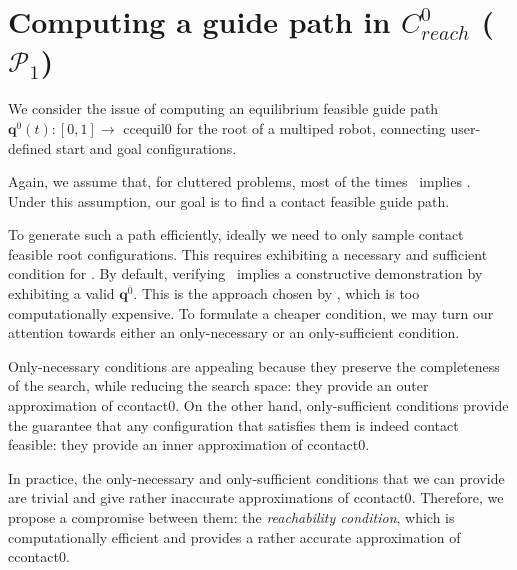 \section{Computing a guide path in $C^0_{reach}$ ($\mathcal{P}_1$) }
\label{rbprm}

We consider the issue of computing an \gls{equilibrium feasible} guide path $\mathbf{q}^0(t) : [0,1] \longrightarrow$ \gls{ccequil0} for the root of a multiped robot, connecting user-defined start and goal configurations.

Again, we assume that, for \gls{cluttered} problems, most of the times \contactfeasibility\, implies \equilibriumfeasibility.
Under this assumption, our goal is to find a \gls{contact feasible} guide path.

To generate such a path efficiently, ideally we need to only sample \gls{contact feasible} root configurations.
This requires exhibiting a necessary and sufficient condition for \contactfeasibility. %
By default, verifying \contactfeasibility\, implies a constructive demonstration by exhibiting a valid $\mathbf{q}^{\overline{0}}$. This is the approach chosen by \cite{Bouyarmane2009},
which is too computationally expensive.
To formulate a cheaper condition, we may turn our attention towards either an only-necessary or an only-sufficient condition.

Only-necessary conditions are appealing because they preserve the completeness of the search, while reducing 
the search space: they provide an outer approximation of \gls{ccontact0}.
On the other hand, only-sufficient conditions provide the guarantee that any configuration that satisfies them is indeed \gls{contact feasible}:
they provide an inner approximation of \gls{ccontact0}.

In practice, the only-necessary and only-sufficient conditions that we can provide are trivial and give rather inaccurate approximations of \gls{ccontact0}.
Therefore, we propose a compromise between them: the \textit{reachability condition}, which is computationally efficient
and provides a rather accurate approximation of \gls{ccontact0}. %



